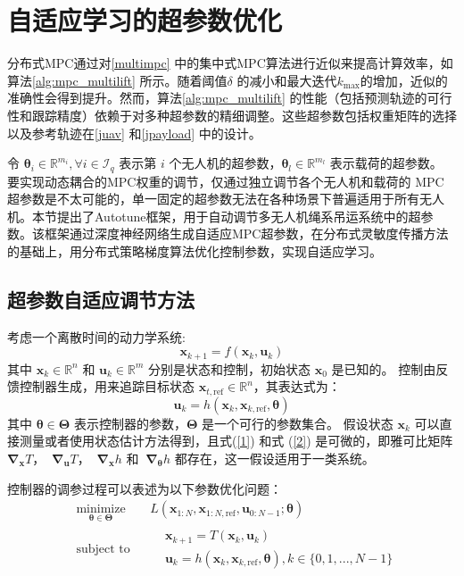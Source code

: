 \documentclass[lang=chs, degree=master, blindreview=false, winfonts=true]{yanputhesis}
\begin{document}
\section{自适应学习的超参数优化}
分布式MPC通过对\autoref{multimpc} 中的集中式MPC算法进行近似来提高计算效率，如算法\ref{alg:mpc_multilift} 所示。随着阈值\(\delta\) 的减小和最大迭代\(k_{\text{max}}\)的增加，近似的准确性会得到提升。然而，算法\ref{alg:mpc_multilift} 的性能（包括预测轨迹的可行性和跟踪精度）依赖于对多种超参数的精细调整。这些超参数包括权重矩阵的选择以及参考轨迹在\autoref{juav} 和\autoref{jpayload} 中的设计。

令 \(\bm \theta_i \in \mathbb{R}^{m_i}, \forall i \in \mathcal{I}_q\) 表示第 \(i\) 个无人机的超参数，\(\bm \theta_l \in \mathbb{R}^{m_l}\) 表示载荷的超参数。
要实现动态耦合的MPC权重的调节，仅通过独立调节各个无人机和载荷的 MPC 超参数是不太可能的，单一固定的超参数无法在各种场景下普遍适用于所有无人机。本节提出了Autotune框架，用于自动调节多无人机绳系吊运系统中的超参数。该框架通过深度神经网络生成自适应MPC超参数，在分布式灵敏度传播方法的基础上，用分布式策略梯度算法优化控制参数，实现自适应学习。

\subsection{超参数自适应调节方法}
考虑一个离散时间的动力学系统:
\begin{equation}
    \bm x_{k+1} = f(\bm x_k, \bm u_k)
	\label{1}
\end{equation}
其中 \( \bm x_k \in \mathbb{R}^n \) 和 \( \bm u_k \in \mathbb{R}^m \) 分别是状态和控制，初始状态 \( \bm x_0 \) 是已知的。  
控制由反馈控制器生成，用来追踪目标状态 \( \bm x_{t,\text{ref}} \in \mathbb{R}^n \)，其表达式为：
\begin{equation}
    \bm u_k = h(\bm x_k, \bm x_{k,\text{ref}}, \bm \theta)
	\label{2}
\end{equation}
其中 \( \bm \theta \in \bm \Theta \) 表示控制器的参数，\( \bm \Theta \) 是一个可行的参数集合。  
假设状态 \( {\bm x}_k \) 可以直接测量或者使用状态估计方法得到，且式(\ref{1}) 和式 (\ref{2}) 是可微的，即雅可比矩阵$\bm \nabla_{\bm x} T$， $\ \bm \nabla_{\bm u} T$， $\ \bm \nabla_{\bm x} h$ 和 $\ \bm \nabla_{\bm \theta} h$
都存在，这一假设适用于一类系统。

控制器的调参过程可以表述为以下参数优化问题：
\begin{equation}
	\label{5}
	\begin{aligned} 
		&\operatorname*{minimize}_{\bm \theta \in \bm \Theta} & & L(\bm x_{1:N}, \bm x_{{1:N},\text{ref}}, \bm u_{0:N-1}; \bm \theta) \\
		&\text{subject to} & & \begin{aligned}
			&\boldsymbol{x}_{{k+1}} = {{T}}\left(\boldsymbol{x}_{k}, \boldsymbol{u}_{{k}}\right) \\
			&\bm u_k = h(\bm x_k, \bm x_{k,\text{ref}}, \bm \theta), k \in \{0,1,...,N-1 \}
		\end{aligned} \\
	\end{aligned}
\end{equation}
\end{document}
